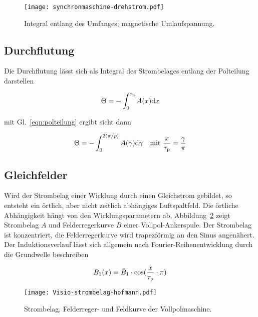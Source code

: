 \begin{figure}[!htb]
\centering
\texttt{[image: synchronmaschine-drehstrom.pdf]}
\label{fig:Visio-strombelag-umlauf}
\caption{Integral entlang des Umfanges; magnetische Umlaufspannung.}
\end{figure}

\subsection{Durchflutung}\label{sec:durchflutung}

Die Durchflutung lässt sich als Integral des Strombelages entlang der Polteilung darstellen

\begin{align}
\Theta = -\int_0^{\tau_{\mathrm{p}}} A(x)\mathrm{d}x
\end{align}

mit Gl.~\ref{eqn:polteilung} ergibt sicht dann \autocite[S.~200]{hofmann2013}

\begin{align}
\Theta = - \int_0^{2(\pi /p)} A(\gamma)\mathrm{d}\gamma \quad \text{mit}\,\, \frac{x}{\tau_{\mathrm{p}}}=\frac{\gamma}{\pi}
\end{align}

\subsection{Gleichfelder}\label{sec:gleichfelder}

Wird der Strombelag einer Wicklung durch einen Gleichstrom gebildet, so entsteht ein örtlich, aber nicht zeitlich abhängiges Luftspaltfeld.
Die örtliche Abhängigkeit hängt von den Wicklungsparametern ab, Abbildung~\ref{fig:Visio-strombelag-hofmann} zeigt Strombelag $A$ und Felderregerkurve $B$ einer Vollpol-Ankerspule.
Der Strombelag ist konzentriert, die Felderregerkurve wird trapezförmig an den Sinus angenähert.
Der Induktionsverlauf lässt sich allgemein nach Fourier-Reihenentwicklung durch die Grundwelle beschreiben

\begin{align}
B_{\mathrm{1}}(x) = \hat{B}_{\mathrm{1}}\cdot\cos(\frac{x}{\tau_{\mathrm{p}}}\cdot \pi)
\end{align}

\begin{figure}[!htb]
\centering
\texttt{[image: Visio-strombelag-hofmann.pdf]}
\label{fig:Visio-strombelag-hofmann}
\caption{Strombelag, Felderreger- und Feldkurve der Vollpolmaschine.}
\end{figure}

